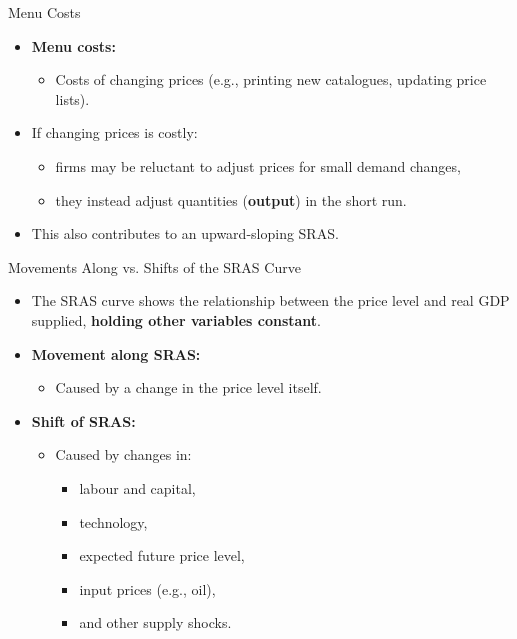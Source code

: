 \documentclass[aspectratio=169]{beamer}
\begin{document}
\begin{frame}{Menu Costs}
\transfade
\begin{itemize}[<+->]
  \item \textbf{Menu costs:}
  \begin{itemize}[<+->]
    \item Costs of changing prices (e.g., printing new catalogues, updating price lists).
  \end{itemize}
  \item If changing prices is costly:
  \begin{itemize}[<+->]
    \item firms may be reluctant to adjust prices for small demand changes,
    \item they instead adjust quantities (\textbf{output}) in the short run.
  \end{itemize}
  \item This also contributes to an upward-sloping SRAS.
\end{itemize}
\end{frame}

\begin{frame}{Movements Along vs. Shifts of the SRAS Curve}
\transfade
\begin{itemize}[<+->]
  \item The SRAS curve shows the relationship between the price level and real GDP supplied, \textbf{holding other variables constant}.
  \item \textbf{Movement along SRAS:}
  \begin{itemize}[<+->]
    \item Caused by a change in the price level itself.
  \end{itemize}
  \item \textbf{Shift of SRAS:}
  \begin{itemize}[<+->]
    \item Caused by changes in:
    \begin{itemize}[<+->]
      \item labour and capital,
      \item technology,
      \item expected future price level,
      \item input prices (e.g., oil),
      \item and other supply shocks.
    \end{itemize}
  \end{itemize}
\end{itemize}
\end{frame}
\end{document}
